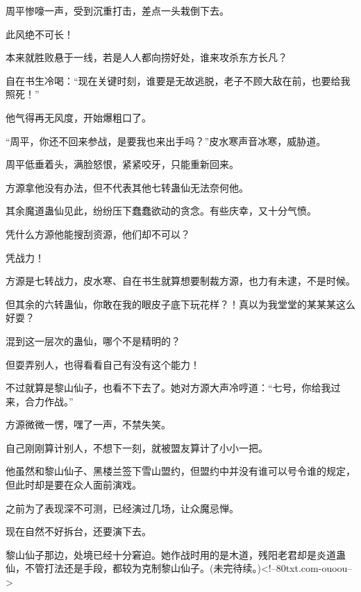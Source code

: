 \begin{this_body}
周平惨嚎一声，受到沉重打击，差点一头栽倒下去。

此风绝不可长！

本来就胜败悬于一线，若是人人都向捞好处，谁来攻杀东方长凡？

自在书生冷喝：“现在关键时刻，谁要是无故逃脱，老子不顾大敌在前，也要给我照死！”

他气得再无风度，开始爆粗口了。

“周平，你还不回来参战，是要我也来出手吗？”皮水寒声音冰寒，威胁道。

周平低垂着头，满脸怒恨，紧紧咬牙，只能重新回来。

方源拿他没有办法，但不代表其他七转蛊仙无法奈何他。

其余魔道蛊仙见此，纷纷压下蠢蠢欲动的贪念。有些庆幸，又十分气愤。

凭什么方源他能搜刮资源，他们却不可以？

凭战力！

方源是七转战力，皮水寒、自在书生就算想要制裁方源，也力有未逮，不是时候。

但其余的六转蛊仙，你敢在我的眼皮子底下玩花样？！真以为我堂堂的某某某这么好耍？

混到这一层次的蛊仙，哪个不是精明的？

但耍弄别人，也得看看自己有没有这个能力！

不过就算是黎山仙子，也看不下去了。她对方源大声冷哼道：“七号，你给我过来，合力作战。”

方源微微一愣，嘿了一声，不禁失笑。

自己刚刚算计别人，不想下一刻，就被盟友算计了小小一把。

他虽然和黎山仙子、黑楼兰签下雪山盟约，但盟约中并没有谁可以号令谁的规定，但此时却是要在众人面前演戏。

之前为了表现深不可测，已经演过几场，让众魔忌惮。

现在自然不好拆台，还要演下去。

黎山仙子那边，处境已经十分窘迫。她作战时用的是木道，残阳老君却是炎道蛊仙，不管打法还是手段，都较为克制黎山仙子。(未完待续。)<!--80txt.com-ouoou-->

\end{this_body}

